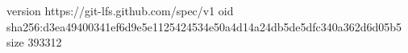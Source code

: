 version https://git-lfs.github.com/spec/v1
oid sha256:d3ea49400341ef6d9e5e1125424534e50a4d14a24db5de5dfc340a362d6d05b5
size 393312

